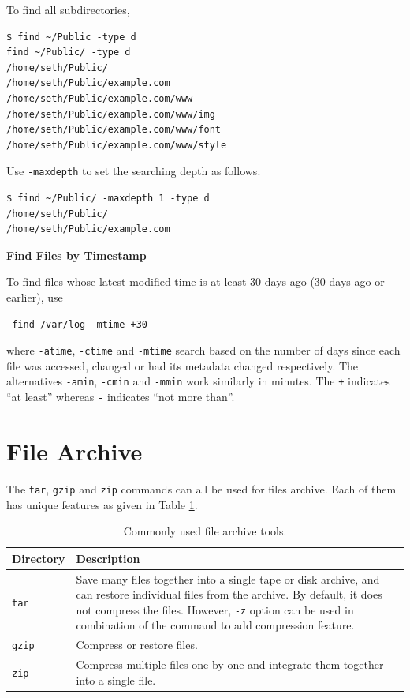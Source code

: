 To find all subdirectories,
\begin{lstlisting}
$ find ~/Public -type d
find ~/Public/ -type d
/home/seth/Public/
/home/seth/Public/example.com
/home/seth/Public/example.com/www
/home/seth/Public/example.com/www/img
/home/seth/Public/example.com/www/font
/home/seth/Public/example.com/www/style
\end{lstlisting}

Use \verb|-maxdepth| to set the searching depth as follows.
\begin{lstlisting}
$ find ~/Public/ -maxdepth 1 -type d
/home/seth/Public/
/home/seth/Public/example.com
\end{lstlisting}

\vspace{0.1in}
\noindent \textbf{Find Files by Timestamp}
\vspace{0.1in}

To find files whose latest modified time is at least 30 days ago (30 days ago or earlier), use
\begin{lstlisting}
 find /var/log -mtime +30
\end{lstlisting}
where \verb|-atime|, \verb|-ctime| and \verb|-mtime| search based on the number of days since each file was accessed, changed or had its metadata changed respectively. The alternatives \verb|-amin|, \verb|-cmin| and \verb|-mmin| work similarly in minutes. The \verb|+| indicates ``at least'' whereas \verb|-| indicates ``not more than''.

\section{File Archive}

The \verb|tar|, \verb|gzip| and \verb|zip| commands can all be used for files archive. Each of them has unique features as given in Table \ref{ch:fm:tab:filearchivetools}.

\begin{table}[!htb]
	\centering \caption{Commonly used file archive tools.}\label{ch:fm:tab:filearchivetools}
	\begin{tabularx}{\textwidth}{lX}
		\hline
		Directory & Description \\ \hline
		\verb|tar| & Save many files together into a single tape or disk archive, and can
		restore individual files from the archive. By default, it does not compress the files. However, \verb|-z| option can be used in combination of the command to add compression feature. \\ 
		\verb|gzip| & Compress or restore files. \\ 
		\verb|zip| & Compress multiple files one-by-one and integrate them together into a single file. \\
		\hline
	\end{tabularx}
\end{table}

